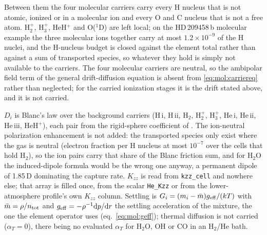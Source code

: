 Between them the four molecular carriers carry every H nucleus
that is not atomic, ionized or in a molecular ion and every O and C nucleus
that is not a free atom. H$_2^+$, H$_3^+$, HeH$^+$ and O($^1$D) are left local; on
the HD\,209458\,b molecular example the three molecular ions together carry
at most $1.2\times10^{-9}$ of the H nuclei, and the H-nucleus budget is
closed against the element total rather than against a sum of transported
species, so whatever they hold is simply not available to the carriers. The
four molecular carriers are neutral, so the ambipolar field term of the
general drift-diffusion equation is absent from \eqref{eq:mol:carriereq}
rather than neglected; for the carried ionization stages it is the drift
stated above, and it is not carried.

$D_i$ is Blanc's law over the background carriers (H\,{\sc i}, H\,{\sc ii},
H$_2$, H$_2^+$, H$_3^+$, He\,{\sc i}, He\,{\sc ii}, He\,{\sc iii},
HeH$^+$), each pair from the rigid-sphere coefficient of \citet{Banks1973}. The ion-neutral polarization enhancement is not added: the
transported species only exist where the gas is neutral (electron fraction
per H nucleus at most $10^{-7}$ over the cells that hold H$_2$), so the ion
pairs carry that share of the Blanc friction sum, and for H$_2$O the
induced-dipole formula would be the wrong one anyway, a permanent dipole of
1.85\,D dominating the capture rate. $K_{zz}$ is read from
\texttt{kzz\_cell} and nowhere else; that array is filled once, from the
scalar \texttt{He\_Kzz} or from the lower-atmosphere profile's own $K_{zz}$
column. Settling is $G_i = (m_i-\bar m)g_{\rm eff}/(kT)$ with
$\bar m = \rho/n_{\rm tot}$ and $g_{\rm eff}=-\rho^{-1}{\rm d}p/{\rm d}r$ the
settling acceleration of the mixture, the one the element operator uses
(eq.~\ref{eq:mol:geff}); thermal diffusion is
not carried ($\alpha_T=0$), there being no evaluated $\alpha_T$ for H$_2$O,
OH or CO in an H$_2$/He bath.

